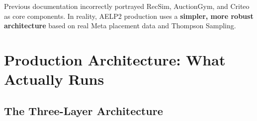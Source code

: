 \documentclass[11pt,a4paper]{report}
\begin{document}
\begin{warningbox}
Previous documentation incorrectly portrayed RecSim, AuctionGym, and Criteo as core components.
In reality, AELP2 production uses a \textbf{simpler, more robust architecture} based on real Meta placement data and Thompson Sampling.
\end{warningbox}

\tableofcontents

\chapter{Production Architecture: What Actually Runs}

\section{The Three-Layer Architecture}
\end{document}
